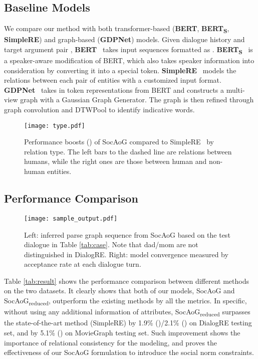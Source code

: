 \documentclass[11pt,a4paper]{article}
\begin{document}
\subsection{Baseline Models}
We compare our method with both transformer-based (\textbf{BERT}, \textbf{BERT\textsubscript{S}}, \textbf{SimpleRE}) and graph-based (\textbf{GDPNet}) models. Given dialogue history  and target argument pair , \textbf{BERT}~\citep{devlin2018bert} takes input sequences formatted as . 
\textbf{BERT\textsubscript{S}}~\citep{yu-etal-2020-dialogue} is a speaker-aware modification of BERT, which also takes speaker information into consideration by converting it into a special token. 
\textbf{SimpleRE}~\citep{xue2020embarrassingly} models the relations between each pair of entities with a customized input format. \textbf{GDPNet}~\citep{xue2020gdpnet} takes in token representations from BERT and constructs a multi-view graph with a Gaussian Graph Generator. The graph is then refined through graph convolution and DTWPool to identify indicative words. 
\begin{figure*}[ht]
\begin{center}
\centerline{\texttt{[image: type.pdf]}}
\caption{Performance boosts () of SocAoG compared to SimpleRE~\citep{xue2020embarrassingly} by relation type. The left bars to the dashed line are relations between humans, while the right ones are those between human and non-human entities.}
\label{fig:rel}
\end{center}
\vspace{-6mm}
\end{figure*}

\subsection{Performance Comparison}
\begin{figure*}[ht]
\begin{center}
\centerline{\texttt{[image: sample\_output.pdf]}}
\caption{Left: inferred parse graph sequence from SocAoG based on the test dialogue in Table \ref{tab:case}. Note that dad/mom are not distinguished in DialogRE. Right: model convergence measured by acceptance rate at each dialogue turn.}
\label{fig:pg}
\end{center}
\vspace{-6mm}
\end{figure*}
Table \ref{tab:result} shows the performance comparison between different methods on the two datasets. 
It clearly shows that both of our models, SocAoG and SocAoG\textsubscript{reduced}, outperform the existing methods by all the metrics. In specific, without using any additional information of attributes, SocAoG\textsubscript{reduced} surpasses the state-of-the-art method (SimpleRE) by 1.9\% ()/2.1\% () on DialogRE testing set, and by 5.1\% () on MovieGraph testing set. Such improvement shows the importance of relational consistency for the modeling, and proves the effectiveness of our SocAoG formulation to introduce the social norm constraints. 
\end{document}
